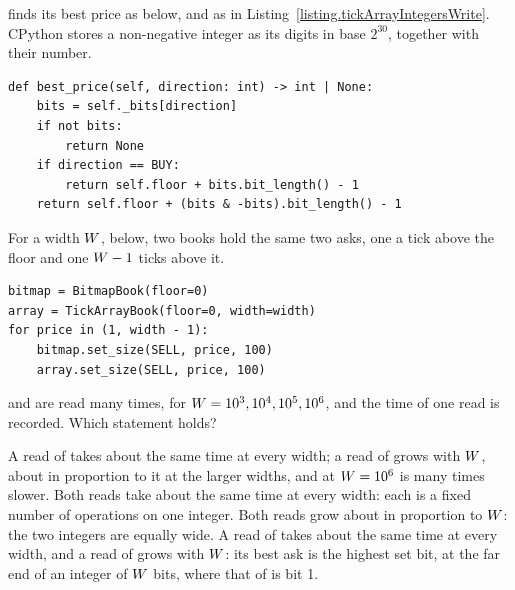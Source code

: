 \begin{question}
\label{question.lowestSetBitCostsTheBand}
 finds its best price as below,
and  as in Listing~\ref{listing.tickArrayIntegersWrite}.
CPython stores a non-negative integer as its digits in base $2^{30}$, together with their number.
\begin{lstlisting}[caption={\protect\codehl{unito26.lob.orderbook.BitmapBook.best\_price}}, label=listing.lowestSetBitCostsBitmap]
def best_price(self, direction: int) -> int | None:
    bits = self._bits[direction]
    if not bits:
        return None
    if direction == BUY:
        return self.floor + bits.bit_length() - 1
    return self.floor + (bits & -bits).bit_length() - 1
\end{lstlisting}
For a width $W$,  below,
two books hold the same two asks, one a tick above the floor and one $W - 1$ ticks above it.
\begin{lstlisting}[caption={The two books of a width}, label=listing.lowestSetBitCostsBooks]
bitmap = BitmapBook(floor=0)
array = TickArrayBook(floor=0, width=width)
for price in (1, width - 1):
    bitmap.set_size(SELL, price, 100)
    array.set_size(SELL, price, 100)
\end{lstlisting}
 and  are read many times,
for $W = 10^{3}, 10^{4}, 10^{5}, 10^{6}$,
and the time of one read is recorded.
Which statement holds?
\begin{choices}
 \correctchoice A read of  takes about the same time at every width;
  a read of  grows with $W$, about in proportion to it at the larger widths,
  and at $W = 10^{6}$ is many times slower.
 \choice Both reads take about the same time at every width:
  each is a fixed number of operations on one integer.
 \choice Both reads grow about in proportion to $W$:
  the two integers are equally wide.
 \choice A read of  takes about the same time at every width,
  and a read of  grows with $W$:
  its best ask is the highest set bit, at the far end of an integer of $W$ bits,
  where that of  is bit 1.
\end{choices}
\end{question}
